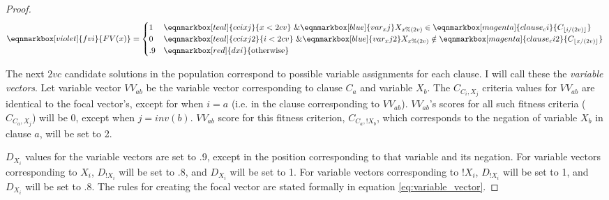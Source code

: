 \documentclass[sigconf]{acmart}
\begin{document}
\begin{proof}
\begin{equation}
\label{eq:focal_vector}
\eqnmarkbox[violet]{fvi}{FV(x)} = \begin{cases} 
1 & \eqnmarkbox[teal]{ccixj}{x < 2cv} \text{ } \& \eqnmarkbox[blue]{var_xj}{X_{x\%(2v)}} \in \eqnmarkbox[magenta]{clause_ci}{C_{\lfloor i/(2v)\rfloor}} \\
0 & \eqnmarkbox[teal]{ccixj2}{i < 2cv} \text{ } \& \eqnmarkbox[blue]{var_xj2}{X_{x\%(2v)}} \notin \eqnmarkbox[magenta]{clause_ci2}{C_{\lfloor x/(2v)\rfloor}} \\
.9 & \eqnmarkbox[red]{dxi}{\text{otherwise}}
\end{cases}
\end{equation}

\vspace{1.5em}

The next $2vc$ candidate solutions in the population correspond to possible variable assignments for each clause. I will call these the \textit{variable vectors}. Let variable vector $VV_{ab}$ be the variable vector corresponding to clause $C_a$ and variable $X_b$. The $C_{C_{i},X_{j}}$ criteria values for $VV_{ab}$ are identical to the focal vector's, except for when $i=a$ (i.e. in the clause corresponding to $VV_{ab}$). $VV_{ab}$'s scores for all such fitness criteria ($C_{C_{a},X_{j}}$) will be 0, except when $j=inv(b)$. $VV_{ab}$ score for this fitness criterion, $C_{C_{a},!X_{b}}$, which corresponds to the negation of variable $X_b$ in clause $a$, will be set to 2. 

$D_{X_{i}}$ values for the variable vectors are set to .9, except in the position corresponding to that variable and its negation. For variable vectors corresponding to $X_{i}$, $D_{!X_{i}}$ will be set to .8, and $D_{X_{i}}$ will be set to 1. For variable vectors corresponding to $!X_{i}$, $D_{!X_{i}}$ will be set to 1, and $D_{X_{i}}$ will be set to .8. The rules for creating the focal vector are stated formally in equation \ref{eq:variable_vector}.

\vspace{3em}


\end{proof}
\end{document}
